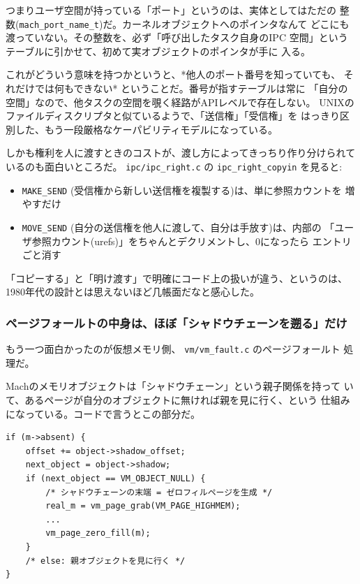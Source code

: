 \documentclass[11pt]{article}
\begin{document}
つまりユーザ空間が持っている「ポート」というのは、実体としてはただの
整数(\texttt{mach\_port\_name\_t})だ。カーネルオブジェクトへのポインタなんて
どこにも渡っていない。その整数を、必ず「呼び出したタスク自身のIPC
空間」というテーブルに引かせて、初めて実オブジェクトのポインタが手に
入る。

これがどういう意味を持つかというと、*他人のポート番号を知っていても、
それだけでは何もできない* ということだ。番号が指すテーブルは常に
「自分の空間」なので、他タスクの空間を覗く経路がAPIレベルで存在しない。
UNIXのファイルディスクリプタと似ているようで、「送信権」「受信権」を
はっきり区別した、もう一段厳格なケーパビリティモデルになっている。

しかも権利を人に渡すときのコストが、渡し方によってきっちり作り分けられて
いるのも面白いところだ。 \texttt{ipc/ipc\_right.c} の \texttt{ipc\_right\_copyin} を見ると:

\begin{itemize}
\item \texttt{MAKE\_SEND} (受信権から新しい送信権を複製する)は、単に参照カウントを
増やすだけ
\item \texttt{MOVE\_SEND} (自分の送信権を他人に渡して、自分は手放す)は、内部の
「ユーザ参照カウント(urefs)」をちゃんとデクリメントし、0になったら
エントリごと消す
\end{itemize}

「コピーする」と「明け渡す」で明確にコード上の扱いが違う、というのは、
1980年代の設計とは思えないほど几帳面だなと感心した。
\subsubsection{ページフォールトの中身は、ほぼ「シャドウチェーンを遡る」だけ}
\label{sec:org3fec270}

もう一つ面白かったのが仮想メモリ側、 \texttt{vm/vm\_fault.c} のページフォールト
処理だ。

Machのメモリオブジェクトは「シャドウチェーン」という親子関係を持って
いて、あるページが自分のオブジェクトに無ければ親を見に行く、という
仕組みになっている。コードで言うとこの部分だ。

\begin{verbatim}
if (m->absent) {
    offset += object->shadow_offset;
    next_object = object->shadow;
    if (next_object == VM_OBJECT_NULL) {
        /* シャドウチェーンの末端 = ゼロフィルページを生成 */
        real_m = vm_page_grab(VM_PAGE_HIGHMEM);
        ...
        vm_page_zero_fill(m);
    }
    /* else: 親オブジェクトを見に行く */
}
\end{verbatim}
\end{document}
